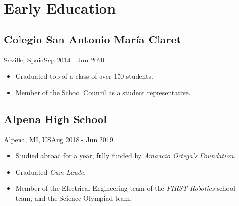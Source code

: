 \section{Early Education}
\subsection{Colegio San Antonio María Claret}{Seville, Spain}{Sep 2014 - Jun 2020}
\begin{itemize}
    \item Graduated top of a class of over 150 students.
    \item Member of the School Council as a student representative.
\end{itemize}
\subsection{Alpena High School}{Alpena, MI, US}{Aug 2018 - Jun 2019}
\begin{itemize}
    \item Studied abroad for a year, fully funded by \textit{Amancio Ortega's Foundation}.
    \item Graduated \textit{Cum Laude}.
    \item Member of the Electrical Engineering team of the \textit{FIRST Robotics} school team, and the Science Olympiad team.


\end{itemize}